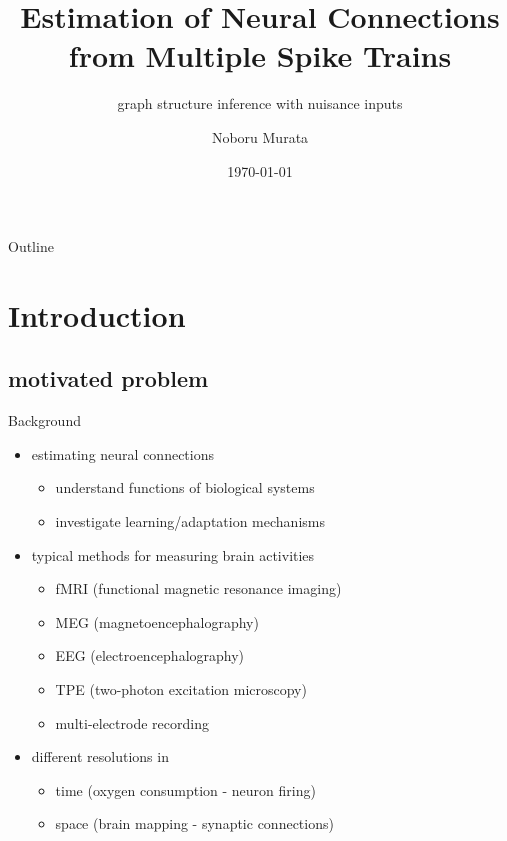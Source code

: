 \documentclass[fleqn,aspectratio=1610]{beamer}
\author{Noboru Murata}
\date{\today}
\title{Estimation of Neural Connections from Multiple Spike Trains}
\subtitle{graph structure inference with nuisance inputs}
\institute{\url{https://noboru-murata.github.io/}}
\begin{document}
\maketitle
\begin{frame}{Outline}
\tableofcontents
\end{frame}


\section{Introduction}
\label{sec:orgad5538c}
\subsection{motivated problem}
\label{sec:org84cdec3}
\begin{frame}[label={sec:orgad5d0a9}]{Background}
\begin{itemize}
\item estimating neural connections

\begin{itemize}
\item understand functions of biological systems
\item investigate learning/adaptation mechanisms
\end{itemize}
\end{itemize}

\smallskip
\begin{itemize}
\item typical methods for measuring brain activities

\begin{itemize}
\item fMRI
(functional magnetic resonance imaging)
\item MEG
(magnetoencephalography)
\item EEG
(electroencephalography)
\item TPE
(two-photon excitation microscopy)
\item \alert{multi-electrode recording}
\end{itemize}
\end{itemize}

\smallskip
\begin{itemize}
\item different resolutions in
\begin{itemize}
\item time (oxygen consumption - neuron firing)
\item space (brain mapping - synaptic connections)
\end{itemize}
\end{itemize}
\end{frame}
\end{document}
